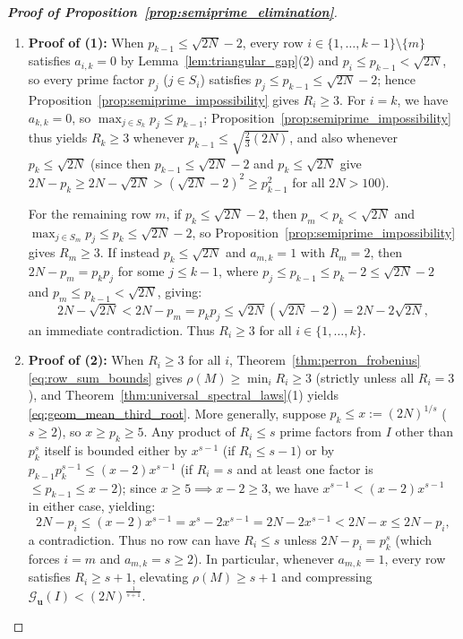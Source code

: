 \documentclass[11pt,a4paper]{article}
\theoremstyle{definition}
\begin{document}
\begin{proof}[\textbf{Proof of Proposition~\ref{prop:semiprime_elimination}}]
\begin{enumerate}
    \item \textbf{Proof of (1):} When $p_{k-1} \le \sqrt{2N} - 2$, every row $i \in \{1, \dots, k-1\} \setminus \{m\}$ satisfies $a_{i,k} = 0$ by Lemma~\ref{lem:triangular_gap}(2) and $p_i \le p_{k-1} < \sqrt{2N}$, so every prime factor $p_j$ ($j \in S_i$) satisfies $p_j \le p_{k-1} \le \sqrt{2N} - 2$; hence Proposition~\ref{prop:semiprime_impossibility} gives $R_i \ge 3$. For $i = k$, we have $a_{k,k} = 0$, so $\max_{j \in S_k} p_j \le p_{k-1}$; Proposition~\ref{prop:semiprime_impossibility} thus yields $R_k \ge 3$ whenever $p_{k-1} \le \sqrt{\frac{2}{3}(2N)}$, and also whenever $p_k \le \sqrt{2N}$ (since then $p_{k-1} \le \sqrt{2N} - 2$ and $p_k \le \sqrt{2N}$ give $2N - p_k \ge 2N - \sqrt{2N} > (\sqrt{2N} - 2)^2 \ge p_{k-1}^2$ for all $2N > 100$).

    For the remaining row $m$, if $p_k \le \sqrt{2N} - 2$, then $p_m < p_k < \sqrt{2N}$ and $\max_{j \in S_m} p_j \le p_k \le \sqrt{2N} - 2$, so Proposition~\ref{prop:semiprime_impossibility} gives $R_m \ge 3$. If instead $p_k \le \sqrt{2N}$ and $a_{m,k} = 1$ with $R_m = 2$, then $2N - p_m = p_k p_j$ for some $j \le k - 1$, where $p_j \le p_{k-1} \le p_k - 2 \le \sqrt{2N} - 2$ and $p_m \le p_{k-1} < \sqrt{2N}$, giving:
    \begin{equation}
    \label{eq:sm2_contradiction}
    2N - \sqrt{2N} < 2N - p_m = p_k p_j \le \sqrt{2N}(\sqrt{2N} - 2) = 2N - 2\sqrt{2N},
    \end{equation}
    an immediate contradiction. Thus $R_i \ge 3$ for all $i \in \{1, \dots, k\}$.
    \item \textbf{Proof of (2):} When $R_i \ge 3$ for all $i$, Theorem~\ref{thm:perron_frobenius} \eqref{eq:row_sum_bounds} gives $\rho(M) \ge \min_i R_i \ge 3$ (strictly unless all $R_i = 3$), and Theorem~\ref{thm:universal_spectral_laws}(1) yields \eqref{eq:geom_mean_third_root}. More generally, suppose $p_k \le x := (2N)^{1/s}$ ($s \ge 2$), so $x \ge p_k \ge 5$. Any product of $R_i \le s$ prime factors from $I$ other than $p_k^s$ itself is bounded either by $x^{s-1}$ (if $R_i \le s - 1$) or by $p_{k-1} p_k^{s-1} \le (x - 2)x^{s-1}$ (if $R_i = s$ and at least one factor is $\le p_{k-1} \le x - 2$); since $x \ge 5 \implies x - 2 \ge 3$, we have $x^{s-1} < (x - 2)x^{s-1}$ in either case, yielding:
    \begin{equation}
    \label{eq:bootstrap_diff_pos}
    2N - p_i \le (x - 2)x^{s-1} = x^s - 2x^{s-1} = 2N - 2x^{s-1} < 2N - x \le 2N - p_i,
    \end{equation}
    a contradiction. Thus no row can have $R_i \le s$ unless $2N - p_i = p_k^s$ (which forces $i = m$ and $a_{m,k} = s \ge 2$). In particular, whenever $a_{m,k} = 1$, every row satisfies $R_i \ge s + 1$, elevating $\rho(M) \ge s + 1$ and compressing $\mathcal{G}_{\mathbf{u}}(I) < (2N)^{\frac{1}{s+1}}$.
\end{enumerate}
\end{proof}
\end{document}
